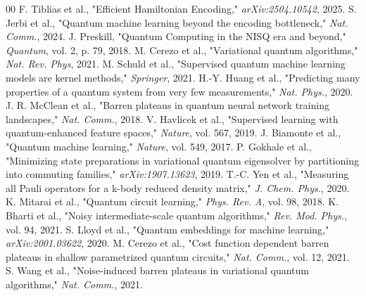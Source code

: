 \documentclass[conference]{IEEEtran}
\begin{document}
\begin{thebibliography}{00}
 F. Tiblias et al., "Efficient Hamiltonian Encoding," \textit{arXiv:2504.10542}, 2025.
 S. Jerbi et al., "Quantum machine learning beyond the encoding bottleneck," \textit{Nat. Comm.}, 2024.
 J. Preskill, "Quantum Computing in the NISQ era and beyond," \textit{Quantum}, vol. 2, p. 79, 2018.
 M. Cerezo et al., "Variational quantum algorithms," \textit{Nat. Rev. Phys}, 2021.
 M. Schuld et al., "Supervised quantum machine learning models are kernel methods," \textit{Springer}, 2021.
 H.-Y. Huang et al., "Predicting many properties of a quantum system from very few measurements," \textit{Nat. Phys.}, 2020.
 J. R. McClean et al., "Barren plateaus in quantum neural network training landscapes," \textit{Nat. Comm.}, 2018.
 V. Havlicek et al., "Supervised learning with quantum-enhanced feature spaces," \textit{Nature}, vol. 567, 2019.
 J. Biamonte et al., "Quantum machine learning," \textit{Nature}, vol. 549, 2017.
 P. Gokhale et al., "Minimizing state preparations in variational quantum eigensolver by partitioning into commuting families," \textit{arXiv:1907.13623}, 2019.
 T.-C. Yen et al., "Measuring all Pauli operators for a k-body reduced density matrix," \textit{J. Chem. Phys.}, 2020.
 K. Mitarai et al., "Quantum circuit learning," \textit{Phys. Rev. A}, vol. 98, 2018.
 K. Bharti et al., "Noisy intermediate-scale quantum algorithms," \textit{Rev. Mod. Phys.}, vol. 94, 2021.
 S. Lloyd et al., "Quantum embeddings for machine learning," \textit{arXiv:2001.03622}, 2020.
 M. Cerezo et al., "Cost function dependent barren plateaus in shallow parametrized quantum circuits," \textit{Nat. Comm.}, vol. 12, 2021.
 S. Wang et al., "Noise-induced barren plateaus in variational quantum algorithms," \textit{Nat. Comm.}, 2021.
\end{thebibliography}
\end{document}
